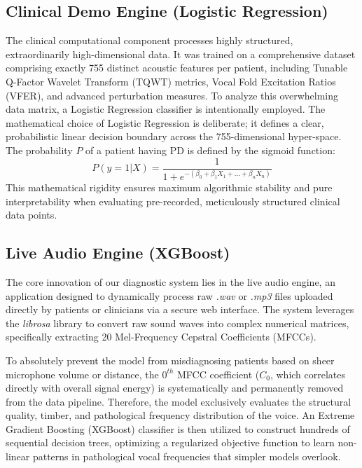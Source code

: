 \documentclass[conference]{IEEEtran}
\begin{document}
\subsection{Clinical Demo Engine (Logistic Regression)}
The clinical computational component processes highly structured, extraordinarily high-dimensional data. It was trained on a comprehensive dataset comprising exactly 755 distinct acoustic features per patient, including Tunable Q-Factor Wavelet Transform (TQWT) metrics, Vocal Fold Excitation Ratios (VFER), and advanced perturbation measures. To analyze this overwhelming data matrix, a Logistic Regression classifier is intentionally employed. The mathematical choice of Logistic Regression is deliberate; it defines a clear, probabilistic linear decision boundary across the 755-dimensional hyper-space. The probability $P$ of a patient having PD is defined by the sigmoid function:
\begin{equation}
P(y=1|X) = \frac{1}{1 + e^{-(\beta_0 + \beta_1 X_1 + ... + \beta_n X_n)}}
\end{equation}
This mathematical rigidity ensures maximum algorithmic stability and pure interpretability when evaluating pre-recorded, meticulously structured clinical data points.

\subsection{Live Audio Engine (XGBoost)}
The core innovation of our diagnostic system lies in the live audio engine, an application designed to dynamically process raw \textit{.wav} or \textit{.mp3} files uploaded directly by patients or clinicians via a secure web interface. The system leverages the \textit{librosa} library to convert raw sound waves into complex numerical matrices, specifically extracting 20 Mel-Frequency Cepstral Coefficients (MFCCs). 

To absolutely prevent the model from misdiagnosing patients based on sheer microphone volume or distance, the $0^{th}$ MFCC coefficient ($C_0$, which correlates directly with overall signal energy) is systematically and permanently removed from the data pipeline. Therefore, the model exclusively evaluates the structural quality, timber, and pathological frequency distribution of the voice. An Extreme Gradient Boosting (XGBoost) classifier is then utilized to construct hundreds of sequential decision trees, optimizing a regularized objective function to learn non-linear patterns in pathological vocal frequencies that simpler models overlook.
\end{document}
